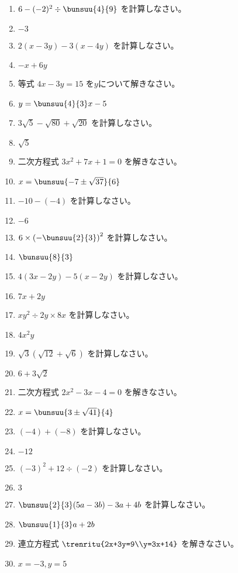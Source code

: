 \documentclass[uplatex,a4j,11pt]{jsreport}
\begin{document}
\begin{multicols}{2}
\begin{enumerate}
    \item $6-(-2)^2\div\bunsuu{4}{9}$ を計算しなさい。%
    \item $-3$
    \item $2(x-3y)-3(x-4y)$ を計算しなさい。%
    \item $-x+6y$
    \item 等式 $4x-3y=15$ を$y$について解きなさい。%
    \item $y=\bunsuu{4}{3}x-5$
    \item $3\sqrt{5}-\sqrt{80}+\sqrt{20}$ を計算しなさい。%
    \item $\sqrt{5}$
    \item 二次方程式 $3x^2+7x+1=0$ を解きなさい。%
    \item $x=\bunsuu{-7\pm\sqrt{37}}{6}$
    \item $-10-(-4)$ を計算しなさい。%
    \item $-6$
    \item $6\times\left(-\bunsuu{2}{3}\right)^2$ を計算しなさい。%
    \item $\bunsuu{8}{3}$
    \item $4(3x-2y)-5(x-2y)$ を計算しなさい。%
    \item $7x+2y$
    \item $xy^2\div2y\times8x$ を計算しなさい。%
    \item $4x^2y$
    \item $\sqrt{3}(\sqrt{12}+\sqrt{6})$ を計算しなさい。%
    \item $6+3\sqrt{2}$
    \item 二次方程式 $2x^2-3x-4=0$ を解きなさい。%
    \item $x=\bunsuu{3\pm\sqrt{41}}{4}$
    \item $(-4)+(-8)$ を計算しなさい。%
    \item $-12$
    \item $(-3)^2+12\div(-2)$ を計算しなさい。%
    \item $3$
    \item $\bunsuu{2}{3}(5a-3b)-3a+4b$ を計算しなさい。%
    \item $\bunsuu{1}{3}a+2b$
    \item 連立方程式 $\trenritu{2x+3y=9\\y=3x+14}$ を解きなさい。%
    \item $x=-3, y=5$

\end{enumerate}
\end{multicols}
\end{document}
